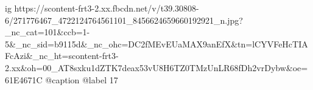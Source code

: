  
 
 
 
 

\ifcmt
  ig https://scontent-frt3-2.xx.fbcdn.net/v/t39.30808-6/271776467_4722124764561101_8456624659660192921_n.jpg?_nc_cat=101&ccb=1-5&_nc_sid=b9115d&_nc_ohc=DC2fMEvEUaMAX9anEfX&tn=lCYVFeHcTIAFcAzi&_nc_ht=scontent-frt3-2.xx&oh=00_AT8sxku1dZTK7deax53vU8H6TZ0TMzUnLR68fDh2vrDybw&oe=61E4671C
  @caption @label 17
\fi
